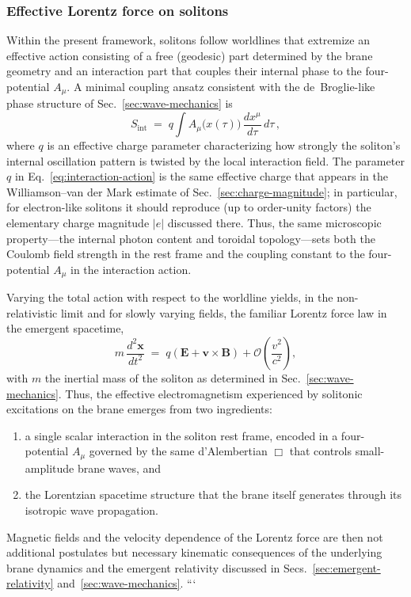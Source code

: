\subsubsection{Effective Lorentz force on solitons}

Within the present framework, solitons follow worldlines that extremize
an effective action consisting of a free (geodesic) part determined by
the brane geometry and an interaction part that couples their internal
phase to the four-potential $A_\mu$.
A minimal coupling ansatz consistent with the de~Broglie-like phase
structure of Sec.~\ref{sec:wave-mechanics} is
\begin{equation}
  S_{\mathrm{int}}
  \;=\;
  q \int A_\mu\bigl(x(\tau)\bigr)\,
  \frac{dx^\mu}{d\tau}\,d\tau\,,
  \label{eq:interaction-action}
\end{equation}
where $q$ is an effective charge parameter characterizing how strongly
the soliton's internal oscillation pattern is twisted by the local
interaction field. The parameter $q$ in Eq.~\eqref{eq:interaction-action}
is the same effective charge that appears in the Williamson--van der Mark
estimate of Sec.~\ref{sec:charge-magnitude}; in particular, for
electron-like solitons it should reproduce (up to order-unity factors)
the elementary charge magnitude $|e|$ discussed there. Thus, the same
microscopic property---the internal photon content and toroidal
topology---sets both the Coulomb field strength in the rest frame and
the coupling constant to the four-potential $A_\mu$ in the interaction
action.

Varying the total action with respect to the worldline yields, in the
non-relativistic limit and for slowly varying fields, the familiar
Lorentz force law in the emergent spacetime,
\begin{equation}
  m\,\frac{d^2\mathbf{x}}{dt^2}
  \;=\;
  q\left(
    \mathbf{E} + \mathbf{v}\times\mathbf{B}
  \right)
  + \mathcal{O}\!\left(\frac{v^2}{c^2}\right),
  \label{eq:lorentz-force}
\end{equation}
with $m$ the inertial mass of the soliton as determined in
Sec.~\ref{sec:wave-mechanics}.
Thus, the effective electromagnetism experienced by solitonic
excitations on the brane emerges from two ingredients:
\begin{enumerate}
  \item a single scalar interaction in the soliton rest frame,
        encoded in a four-potential $A_\mu$ governed by the same
        d'Alembertian $\Box$ that controls small-amplitude brane
        waves, and
  \item the Lorentzian spacetime structure that the brane itself
        generates through its isotropic wave propagation.
\end{enumerate}
Magnetic fields and the velocity dependence of the Lorentz force are
then not additional postulates but necessary kinematic consequences of
the underlying brane dynamics and the emergent relativity discussed in
Secs.~\ref{sec:emergent-relativity} and~\ref{sec:wave-mechanics}.
```

